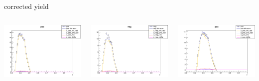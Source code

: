 \begin{frame}{corrected yield}
\begin{columns}
\begin{column}[T]{0.25\textwidth}
\includegraphics[width = \textwidth]{results/yield/statistics_corr/yield_x_Q2_z_0.45_4.750_0.40_pos.png}
\end{column}
\begin{column}[T]{0.25\textwidth}
\includegraphics[width = \textwidth]{results/yield/statistics_corr/yield_x_Q2_z_0.45_4.750_0.40_neg.png}
\end{column}
\begin{column}[T]{0.25\textwidth}
\includegraphics[width = \textwidth]{results/yield/statistics_corr/yield_x_Q2_z_0.45_4.750_0.50_pos.png}

\end{column}
\end{columns}
\end{frame}
